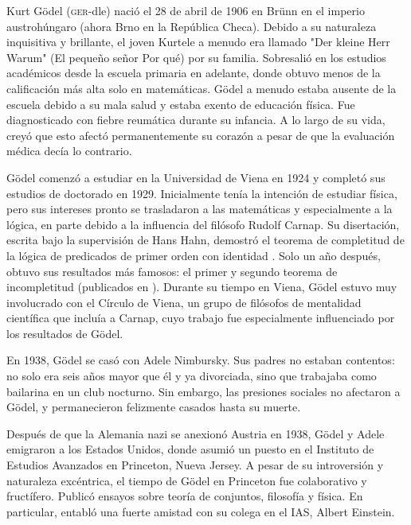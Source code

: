 \documentclass[../../../include/open-logic-section]{subfiles}
\begin{document}



Kurt G{\"o}del (\textsc{ger}-dle) nació el 28 de abril de 1906 en Br{\"u}nn en el imperio austrohúngaro (ahora Brno en la República Checa). Debido a su naturaleza inquisitiva y brillante, el joven Kurtele a menudo era llamado "Der kleine Herr Warum" (El pequeño señor Por qué) por su familia. Sobresalió en los estudios académicos desde la escuela primaria en adelante, donde obtuvo menos de la calificación más alta solo en matemáticas. G{\"o}del a menudo estaba ausente de la escuela debido a su mala salud y estaba exento de educación física. Fue diagnosticado con fiebre reumática durante su infancia. A lo largo de su vida, creyó que esto afectó permanentemente su corazón a pesar de que la evaluación médica decía lo contrario.

G{\"o}del comenzó a estudiar en la Universidad de Viena en 1924 y completó sus estudios de doctorado en 1929. Inicialmente tenía la intención de estudiar física, pero sus intereses pronto se trasladaron a las matemáticas y especialmente a la lógica, en parte debido a la influencia del filósofo Rudolf Carnap. Su disertación, escrita bajo la supervisión de Hans Hahn, demostró el teorema de completitud de la lógica de predicados de primer orden con identidad \citep{Godel1929}. Solo un año después, obtuvo sus resultados más famosos: el primer y segundo teorema de incompletitud (publicados en \citealt{Godel1931}). Durante su tiempo en Viena, G{\"o}del estuvo muy involucrado con el Círculo de Viena, un grupo de filósofos de mentalidad científica que incluía a Carnap, cuyo trabajo fue especialmente influenciado por los resultados de G{\"o}del.

En 1938, G\"odel se casó con Adele Nimbursky. Sus padres no estaban contentos: no solo era seis años mayor que él y ya divorciada, sino que trabajaba como bailarina en un club nocturno. Sin embargo, las presiones sociales no afectaron a G{\"o}del, y permanecieron felizmente casados hasta su muerte.

Después de que la Alemania nazi se anexionó Austria en 1938, G{\"o}del y Adele emigraron a los Estados Unidos, donde asumió un puesto en el Instituto de Estudios Avanzados en Princeton, Nueva Jersey. A pesar de su introversión y naturaleza excéntrica, el tiempo de G{\"o}del en Princeton fue colaborativo y fructífero. Publicó ensayos sobre teoría de conjuntos, filosofía y física. En particular, entabló una fuerte amistad con su colega en el IAS, Albert Einstein.
\end{document}
